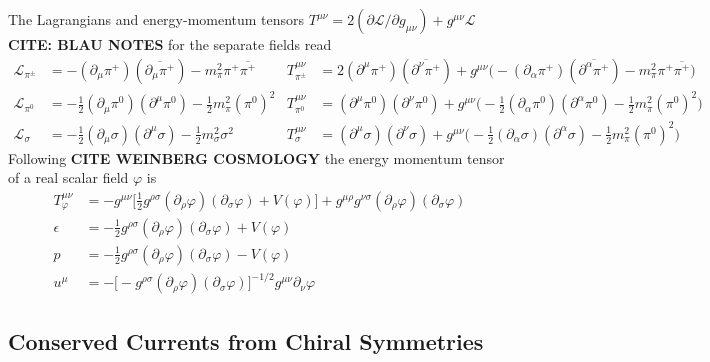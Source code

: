 The Lagrangians and energy-momentum tensors $T^{\mu\nu}=2(\partial\mathscr{L}/\partial g_{\mu\nu})+g^{\mu\nu}\mathscr{L}$ \textbf{CITE: BLAU NOTES} for the separate fields read
\begin{subequations}
    \begin{align}
        \mathscr{L}_{\pi^\pm}&=-(\partial_\mu\pi^+)(\overline{\partial_\mu\pi^+})-m_\pi^2\pi^+\overline{\pi^+}&T^{\mu\nu}_{\pi^\pm}&=2(\partial^\mu\pi^+)(\overline{\partial^\nu\pi^+})+g^{\mu\nu}\big(-(\partial_\alpha\pi^+)(\overline{\partial^\alpha\pi^+})-m_\pi^2\pi^+\overline{\pi^+}\big)\\
        \mathscr{L}_{\pi^0}&=-\frac{1}{2}(\partial_\mu\pi^0)(\partial^\mu\pi^0)-\frac{1}{2}m_\pi^2(\pi^0)^2&T^{\mu\nu}_{\pi^0}&=(\partial^\mu\pi^0)(\partial^\nu\pi^0)+g^{\mu\nu}\big(-\frac{1}{2}(\partial_\alpha\pi^0)(\partial^\alpha\pi^0)-\frac{1}{2}m_\pi^2(\pi^0)^2\big)\\
        \mathscr{L}_\sigma&=-\frac{1}{2}(\partial_\mu\sigma)(\partial^\mu\sigma)-\frac{1}{2}m_\sigma^2\sigma^2&T^{\mu\nu}_{\sigma}&=(\partial^\mu\sigma)(\partial^\nu\sigma)+g^{\mu\nu}\big(-\frac{1}{2}(\partial_\alpha\sigma)(\partial^\alpha\sigma)-\frac{1}{2}m_\pi^2(\pi^0)^2\big)
    \end{align}
\end{subequations}
Following \textbf{CITE WEINBERG COSMOLOGY} the energy momentum tensor of a real scalar field $\varphi$ is
\begin{subequations}
    \begin{align}
        T_\varphi^{\mu\nu}&=-g^{\mu\nu}\big[\frac{1}{2}g^{\rho\sigma}(\partial_\rho\varphi)(\partial_\sigma\varphi)+V(\varphi)\big]+g^{\mu\rho}g^{\nu\sigma}(\partial_\rho\varphi)(\partial_\sigma\varphi)\\
        \epsilon&=-\frac{1}{2}g^{\rho\sigma}(\partial_\rho\varphi)(\partial_\sigma\varphi)+V(\varphi)\\
        p&=-\frac{1}{2}g^{\rho\sigma}(\partial_\rho\varphi)(\partial_\sigma\varphi)-V(\varphi)\\
        u^\mu&=-\big[-g^{\rho\sigma}(\partial_\rho\varphi)(\partial_\sigma\varphi)\big]^{-1/2}g^{\mu\nu}\partial_\nu\varphi
    \end{align}
\end{subequations}


\subsection{Conserved Currents from Chiral Symmetries}


